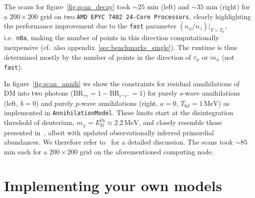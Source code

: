 \documentclass[11pt,a4paper]{article}
\begin{document}
The scans for figure~\ref{fig:scan_decay} took $\sim 25$ min (left) and $\sim 35$ min (right) for a $200 \times 200$ grid on two \texttt{AMD EPYC 7402 24-Core Processors}, clearly highlighting the performance improvement due to the \texttt{fast} parameter $(n_\phi/n_\gamma)|_{T=T_0}$, i.e.\ \texttt{n0a}, making the number of points in this direction computationally inexpensive (cf.\ also appendix~\ref{sec:benchmarks_single}). The runtime is thus determined mostly by the number of points in the direction of $\tau_\phi$ or $m_\phi$ (not \texttt{fast}).

In figure~\ref{fig:scan_annih} we show the constraints for residual annihilations of DM into two photons ($\text{BR}_{\gamma \gamma} = 1 - \text{BR}_{e^+ e^-} = 1$) for purely $s$-wave annihilations (left, $b = 0$) and purely $p$-wave annihilations (right, $a = 0$, $T_\mathrm{kd} = 1 \, \mathrm{MeV}$) as implemented in \texttt{AnnihilationModel}. These limits start at the disintegration threshold of deuterium, $m_\chi = E_\mathrm{D}^\mathrm{th} \approx 2.2 \, \mathrm{MeV}$, and closely resemble those presented in~\cite{Depta:2019lbe}, albeit with updated observationally inferred primordial abundances. We therefore refer to~\cite{Depta:2019lbe} for a detailed discussion. The scans took $\sim 85$ min each for a $200 \times 200$ grid on the aforementioned computing node.

\section{Implementing your own models}
\label{sec:implementing_models}
\end{document}
